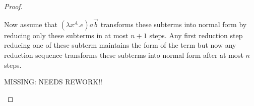 \begin{theorem}
\begin{proof}
\begin{enumerate}
\begin{enumerate}
                        Now assume that $(\lambda x^A.e)a \vec b$ transforms
                        these subterms into normal form by reducing only these
                        subterms in at most $n+1$ steps. Any first reduction
                        step reducing one of these subterm maintains the form of
                        the term but now any reduction sequence transforms these
                        subterms into normal form after at most $n$ steps.

                        MISSING: NEEDS REWORK!!
                \end{enumerate}
        \end{enumerate}
    \end{proof}
\end{theorem}
